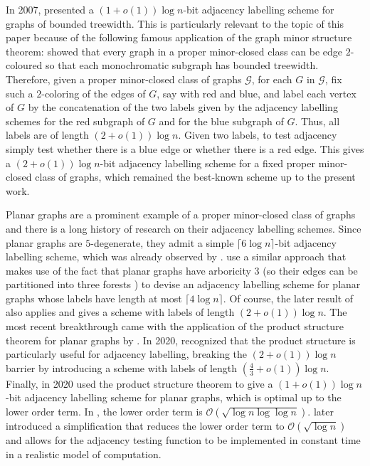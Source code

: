 \documentclass{patmorin}
\newcommand{\vida}[1]{\noindent{\color{pink} VD: #1}}
\newcommand{\piotr}[1]{\noindent\textcolor{red}{PiMi: #1}}
\newcommand{\Oh}{\calO}
\newcommand{\calG}{\mathcal{G}}
\newcommand{\calO}{\mathcal{O}}
\begin{document}

In 2007, \citet{gavoille.labourel:shorter} presented
a $(1+o(1))\log n$-bit adjacency labelling scheme for graphs of bounded treewidth.
This is particularly relevant to the topic of this paper because of the following famous application of the graph minor structure theorem:
\citet{devos2004} showed that every graph
in a proper minor-closed class can be edge $2$-coloured so that each monochromatic subgraph
has bounded treewidth.
Therefore, given a proper minor-closed class of graphs $\calG$,
for each $G$ in $\calG$, fix such a $2$-coloring of the edges of $G$, say with red and blue, and label each vertex of $G$ by the concatenation of the two labels given by the adjacency labelling schemes for the red subgraph of $G$ and for the blue subgraph of $G$. Thus, all labels are of length $(2+o(1))\log n$.
Given two labels, to test adjacency simply test whether there is a blue edge or whether there is a red edge.
This gives a $(2+o(1))\log n$-bit adjacency labelling scheme for a fixed proper minor-closed class of graphs, which remained the best-known scheme up to the present work.

Planar graphs are a prominent example of a proper minor-closed class of graphs and there is a long history of research
on their adjacency labelling schemes.
Since planar graphs are $5$-degenerate,
they admit a simple $\lceil6\log n\rceil$-bit adjacency labelling scheme, which was already observed by \citet{muller:local}.
\citet{kannan.naor.ea:implicit} use a similar approach that makes use of the fact that planar graphs have arboricity 3 (so their edges can be partitioned into three forests \cite{nash-williams:edge-disjoint}) to devise an adjacency labelling scheme for planar graphs whose labels have length at most $\lceil4\log n\rceil$. %
 Of course, the later result of \citet{gavoille.labourel:shorter} also applies and gives a scheme with labels of length $(2+o(1))\log n$.
The most recent breakthrough came with the application of the product structure theorem for planar graphs by \citet{dujmovic.joret.ea:planar}.
In 2020, \citet{BGP22} recognized that the product structure is particularly useful for adjacency labelling, breaking the $(2+o(1))\log n$  barrier by introducing a scheme with labels of length $(\frac{4}{3}+o(1))\log n$.
Finally, in 2020 \citet{dujmovic.esperet.ea:adjacency} used the product structure theorem to give a $(1+o(1))\log n$-bit adjacency labelling scheme for planar graphs, which is optimal up to the lower order term. In \cite{dujmovic.esperet.ea:adjacency}, the lower order term is $\Oh(\sqrt{\log n\log\log n})$.  \citet{gawrychowski.janczewski:simpler} later introduced a simplification that reduces the lower order term to $\Oh(\sqrt{\log n})$ and allows for the adjacency testing function to be implemented in constant time in a realistic model of computation.
\end{document}

